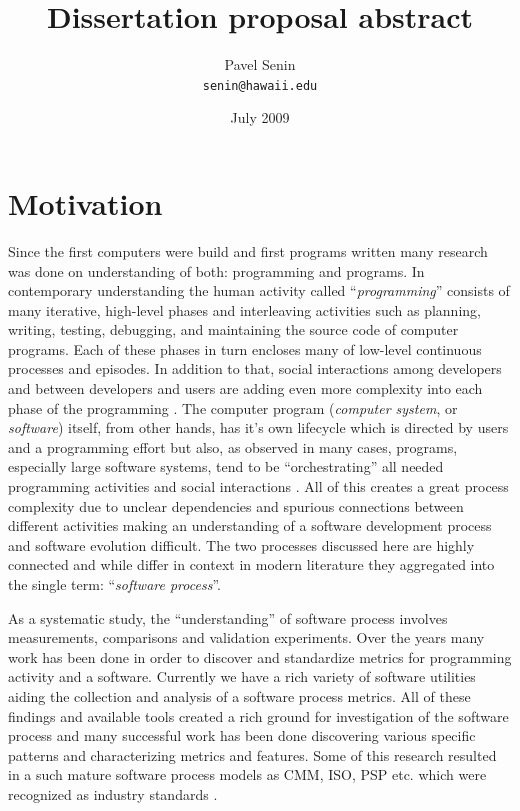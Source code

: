 \documentclass[11pt,oneside]{article}
\begin{document}
\title{Dissertation proposal abstract}
\author{Pavel Senin \\
 \texttt{senin@hawaii.edu}
}
\date{July 2009}
\maketitle

\section{Motivation}
Since the first computers were build and first programs written many research was done on understanding of both: programming and programs. In contemporary understanding the human activity called ``\textit{programming}'' consists of many iterative, high-level phases and interleaving activities such as planning, writing, testing, debugging, and maintaining the source code of computer programs. Each of these phases in turn encloses many of low-level continuous processes and episodes. In addition to that, social interactions among developers and between developers and users are adding even more complexity into each phase of the programming \cite{citeulike:5029482}. The computer program (\textit{computer system}, or \textit{software}) itself, from other hands, has it's own lifecycle which is directed by users and a programming effort but also, as observed in many cases, programs, especially large software systems, tend to be ``orchestrating'' all needed programming activities and social interactions \cite{citeulike:5042856}. All of this creates a great process complexity due to unclear dependencies and spurious connections between different activities making an understanding of a software development process and software evolution difficult. The two processes discussed here are highly connected and while differ in context in modern literature they aggregated into the single term: ``\textit{software process}''.

As a systematic study, the ``understanding'' of software process involves measurements, comparisons and validation experiments. Over the years many work has been done in order to discover and standardize metrics for programming activity and a software. Currently we have a rich variety of software utilities aiding the collection and analysis of a software process metrics. All of these findings and available tools created a rich ground for investigation of the software process and many successful work has been done discovering various specific patterns and characterizing metrics and features. Some of this research resulted in a such mature software process models as CMM, ISO, PSP etc. which were recognized as industry standards \cite{citeulike:5043104}.
\end{document}
